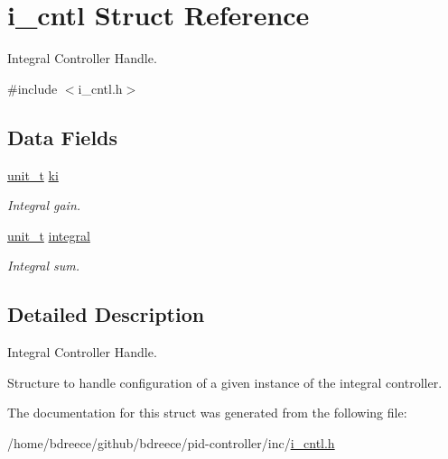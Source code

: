 \hypertarget{structi__cntl}{}\section{i\+\_\+cntl Struct Reference}
\label{structi__cntl}


Integral Controller Handle.  




{\ttfamily \#include $<$i\+\_\+cntl.\+h$>$}

\subsection*{Data Fields}
\begin{DoxyCompactItemize}
\item 
\mbox{\label{structi__cntl_ad47354f9d952c54818d55a433e680b8a}} 
\hyperlink{pid__conf_8h_a86e89cbe1fee619005bafce52850ab0c}{unit\+\_\+t} \hyperlink{structi__cntl_ad47354f9d952c54818d55a433e680b8a}{ki}
\begin{DoxyCompactList}\small\item\em Integral gain. \end{DoxyCompactList}\item 
\mbox{\label{structi__cntl_a5a30959720aff74acf2e2d4a75cfabd1}} 
\hyperlink{pid__conf_8h_a86e89cbe1fee619005bafce52850ab0c}{unit\+\_\+t} \hyperlink{structi__cntl_a5a30959720aff74acf2e2d4a75cfabd1}{integral}
\begin{DoxyCompactList}\small\item\em Integral sum. \end{DoxyCompactList}\end{DoxyCompactItemize}


\subsection{Detailed Description}
Integral Controller Handle. 

Structure to handle configuration of a given instance of the integral controller. 

The documentation for this struct was generated from the following file\+:\begin{DoxyCompactItemize}
\item 
/home/bdreece/github/bdreece/pid-\/controller/inc/\hyperlink{i__cntl_8h}{i\+\_\+cntl.\+h}\end{DoxyCompactItemize}
